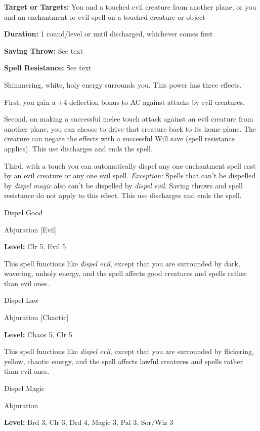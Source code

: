 \documentclass{article}
\begin{document}
\textbf{Target or Targets:} You and a touched evil creature from another plane; 
or you and an enchantment or evil spell on a touched creature or object

\textbf{Duration:} 1 round/level or until discharged, whichever comes first

\textbf{Saving Throw:} See text

\textbf{Spell Resistance:} See text

Shimmering, white, holy energy surrounds you. This power has three effects.

First, you gain a +4 deflection bonus to AC against attacks by evil creatures.

Second, on making a successful melee touch attack against an evil creature from 
another plane, you can choose to drive that creature back to its home plane. The 
creature can negate the effects with a successful Will save (spell resistance applies). 
This use discharges and ends the spell.

Third, with a touch you can automatically dispel any one enchantment spell cast 
by an evil creature or any one evil spell. \textit{Exception: }Spells that can't 
be dispelled by \textit{dispel magic }also can't be dispelled by \textit{dispel 
evil}. Saving throws and spell resistance do not apply to this effect. This use 
discharges and ends the spell.

\vspace{12pt}
Dispel Good

Abjuration [Evil]

\textbf{Level:} Clr 5, Evil 5

This spell functions like \textit{dispel evil}, except that you are surrounded 
by dark, wavering, unholy energy, and the spell affects good creatures and spells 
rather than evil ones.

\vspace{12pt}
Dispel Law

Abjuration [Chaotic]

\textbf{Level:} Chaos 5, Clr 5

This spell functions like \textit{dispel evil}, except that you are surrounded 
by flickering, yellow, chaotic energy, and the spell affects lawful creatures and 
spells rather than evil ones.

\vspace{12pt}
Dispel Magic

Abjuration

\textbf{Level:} Brd 3, Clr 3, Drd 4, Magic 3, Pal 3, Sor/Wiz 3
\end{document}
